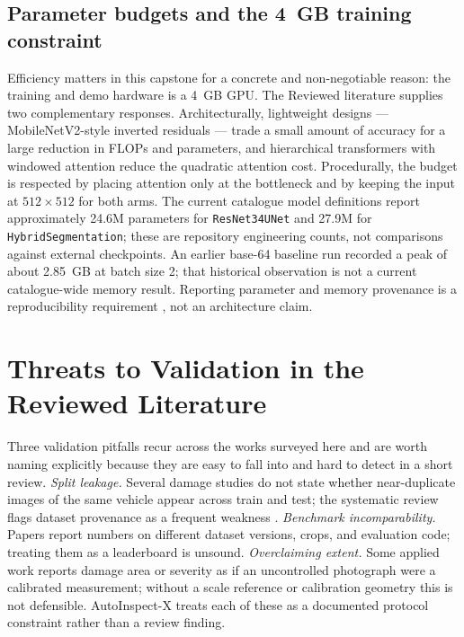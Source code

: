 \documentclass[conference]{IEEEtran}
\begin{document}
\subsection{Parameter budgets and the 4~GB training constraint}
Efficiency matters in this capstone for a concrete and non-negotiable reason:
the training and demo hardware is a 4~GB GPU. The Reviewed literature supplies
two complementary responses. Architecturally, lightweight designs --- 
MobileNetV2-style inverted residuals \cite{mobilenetv2} --- trade a small amount
of accuracy for a large reduction in FLOPs and parameters, and hierarchical
transformers with windowed attention \cite{swin2021} reduce the quadratic
attention cost. Procedurally, the budget is respected by placing attention only
at the bottleneck and by keeping the input at $512\times512$ for both arms. The
current catalogue model definitions report approximately 24.6M parameters for
\texttt{ResNet34UNet} and 27.9M for \texttt{HybridSegmentation}; these are
repository engineering counts, not comparisons against external checkpoints.
An earlier base-64 baseline run recorded a peak of about 2.85~GB at batch size
2; that historical observation is not a current catalogue-wide memory result.
Reporting parameter and memory provenance is a reproducibility requirement
\cite{hasan2025}, not an architecture claim.

\section{Threats to Validation in the Reviewed Literature}
Three validation pitfalls recur across the works surveyed here and are worth
naming explicitly because they are easy to fall into and hard to detect in a
short review. \emph{Split leakage.} Several damage studies do not state whether
near-duplicate images of the same vehicle appear across train and test; the
systematic review flags dataset provenance as a frequent weakness
\cite{hasan2025}. \emph{Benchmark incomparability.} Papers report numbers on
different dataset versions, crops, and evaluation code; treating them as a
leaderboard is unsound. \emph{Overclaiming extent.} Some applied work reports
damage area or severity as if an uncontrolled photograph were a calibrated
measurement; without a scale reference or calibration geometry this is not
defensible. AutoInspect-X treats each of these as a documented protocol
constraint rather than a review finding.
\end{document}
